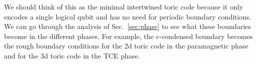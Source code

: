 We should think of this as the minimal intertwined toric code because it only encodes a single logical qubit and has no need for periodic boundary conditions. We can go through the analysis of Sec.~\ref{sec:phase} to see what these boundaries become in the different phases. For example, the $e$-condensed boundary becomes the rough boundary conditions for the 2d toric code in the paramagnetic phase and for the 3d toric code in the TCE phase.
